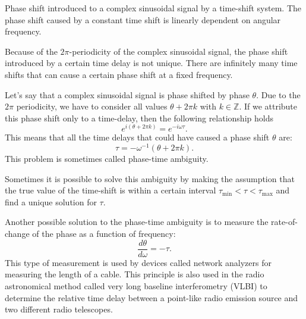 \begin{marginfigure}
  \begin{center}
  \end{center}
  \caption{Phase shift introduced to a complex sinusoidal signal by a time-shift system. The phase shift caused by a constant time shift is linearly dependent on angular frequency.}
  \label{fig:timeshift_phase}
\end{marginfigure}

Because of the $2\pi$-periodicity of the complex sinusoidal signal,
the phase shift introduced by a certain time delay is not
unique. There are infinitely many time shifts that can cause a certain
phase shift at a fixed frequency.

Let's say that a complex sinusoidal signal is phase shifted by phase
$\theta$. Due to the $2\pi$ periodicity, we have to consider all
values $\theta + 2\pi k$ with $k\in\mathbb{Z}$. If we attribute this
phase shift only to a time-delay, then the following relationship holds
\begin{equation}
  e^{i (\theta+2\pi k)} = e^{-i \omega \tau}.
\end{equation}
This means that all the time delays that could have caused a phase shift $\theta$ are:
\begin{equation}
  \tau = -\omega^{-1}(\theta+2\pi k).
\end{equation}
This problem is sometimes called phase-time ambiguity.

Sometimes it is possible to solve this ambiguity by making the assumption that the true value
of the time-shift is within a certain interval $\tau_{\mathrm{min}} < \tau < \tau_{\mathrm{max}}$
and find a unique solution for $\tau$.

Another possible solution to the phase-time ambiguity is to measure the rate-of-change of the
phase as a function of frequency:
\begin{equation}
  \frac{d\theta}{d\omega} = -\tau.
\end{equation}
This type of measurement is used by devices called network analyzers for measuring the length of a cable.
This principle is also used in the radio astronomical method called very long baseline interferometry (VLBI)
to determine the relative time delay between a point-like radio emission source and two different radio telescopes.

